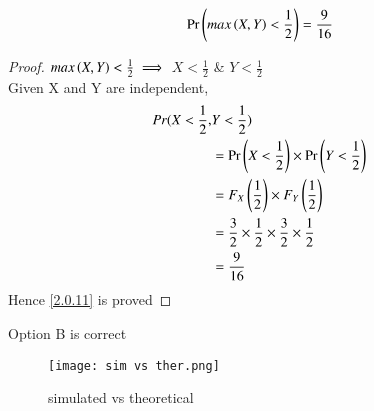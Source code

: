 \documentclass[journal,12pt,twocolumn]{IEEEtran}
\begin{document}
\begin{lemma}
\begin{align}
    \Pr\left({max\left(X,Y\right)<\frac{1}{2}}\right) = \frac{9}{16}\label{2.0.11}
\end{align}
\end{lemma}
\begin{proof}
\({max\left(X,Y\right)}<\frac{1}{2} \implies\) \(X<\frac{1}{2}\) \& \(Y<\frac{1}{2}\)\\
Given X and Y are independent,
\begin{align}
    Pr(X<\frac{1}{2},&Y<\frac{1}{2})\\
    &=\Pr\left(X <\frac{1}{2}\right)\times \Pr\left(Y <\frac{1}{2}\right)\\
    &=F_X\left(\frac{1}{2}\right) \times F_Y\left(\frac{1}{2}\right)\\
   &=\frac{3}{2}\times\frac{1}{2}\times\frac{3}{2}\times\frac{1}{2}\\
    &=\frac{9}{16}
\end{align}
Hence \eqref{2.0.11} is proved
\end{proof}
Option B is correct
\begin{figure}[h!]
    \centering
    \texttt{[image: sim vs ther.png]}
    \caption{simulated vs theoretical}
    \label{fig:my_label}
\end{figure}
\end{document}
